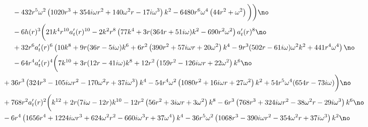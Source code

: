 \documentclass[preprintnumbers,aps,prd,longbibliography,nofootinbib,nobibnotes,amsmath,amssymb]{revtex4}
\begin{document}
\begin{align}
		&-432 r^5 \omega ^2 \left(1020 r^3+354 i \omega  r^2+140 \omega ^2 r-17 i \omega ^3\right) k^2-6480 r^6 \omega ^4 \left(44 r^2+\omega ^2\right)\bigg)\bigg)\no\\
		& -6 h(r)^3 \bigg(21 k^4 r^{10} a_t'(r)^{10}-2 k^2 r^8 \left(77 k^4+3 r (364 r+51 i \omega ) k^2-690 r^2 \omega ^2\right) a_t'(r)^8\no\\
		&+32 r^6 a_t'(r)^6 \left(10 k^8+9 r (36 r-5 i \omega ) k^6+6 r^2 \left(390 r^2+57 i \omega  r+20 \omega ^2\right) k^4-9 r^3 (502 r-61 i \omega ) \omega ^2 k^2+441 r^4 \omega^4\right)\no\\
		& -64 r^4 a_t'(r)^4\bigg(7 k^{10}+3 r (12 r-41 i \omega ) k^8+12 r^2 \left(159 r^2-126 i \omega  r+22 \omega ^2\right) k^6\no\\
		&\hspace{-0.5cm}+36 r^3 \left(324 r^3-105 i \omega  r^2-170 \omega ^2 r+37 i \omega ^3\right) k^4-54 r^4 \omega ^2 \left(1080 r^2+16 i \omega  r+27 \omega ^2\right) k^2+54 r^5 \omega ^4 (654 r-73 i \omega )\bigg)\no\\
		& \hspace{-0.5cm}+768 r^2 a_t'(r)^2\bigg(k^{12}+2 r (7 i \omega -12 r) k^{10}-12 r^2 \left(56 r^2+3 i \omega  r+3 \omega ^2\right) k^8-6 r^3 \left(768 r^3+324 i \omega  r^2-38 \omega ^2 r-29 i \omega ^3\right) k^6\no\\
		&\hspace{-0.5cm}-6 r^4 \left(1656 r^4+1224 i \omega  r^3+624 \omega ^2 r^2-660 i \omega ^3 r+37 \omega ^4\right) k^4-36 r^5 \omega ^2 \left(1068 r^3-390 i \omega  r^2-354 \omega ^2 r+37 i \omega ^3\right) k^2\no
		\end{align}
\end{document}
